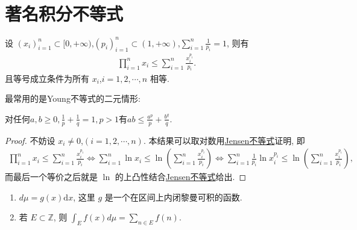 \documentclass[../../main.tex]{subfiles}
\begin{document}
\section{著名积分不等式}

\begin{theorem}[Young不等式初等形式]\label{theorem:Young不等式初等形式}
设 $(x_i)_{i = 1}^n \subset [0, +\infty)$,$(p_i)_{i = 1}^n \subset (1, +\infty)$,$\sum_{i = 1}^n \frac{1}{p_i} = 1$, 则有
\begin{align*}
\prod_{i = 1}^n x_i \leqslant \sum_{i = 1}^n \frac{x_i^{p_i}}{p_i}.
\end{align*}
且等号成立条件为所有 $x_i$,$i = 1,2,\cdots,n$ 相等.
\end{theorem}
\begin{note}
最常用的是Young不等式的二元情形:

对任何$a,b\geq0,\frac{1}{p}+\frac{1}{q}=1,p>1$有$ab\leqslant \frac{a^p}{p}+\frac{b^q}{q}.$
\end{note}
\begin{proof}
不妨设 $x_i \neq 0$,$(i = 1,2,\cdots,n)$. 本结果可以取对数用\hyperref[theorem:Jensen不等式1111]{Jensen不等式}证明, 即
\begin{align*}
\prod_{i = 1}^n x_i \leqslant \sum_{i = 1}^n \frac{x_i^{p_i}}{p_i}\Leftrightarrow \sum_{i = 1}^n \ln x_i \leqslant \ln \left(\sum_{i = 1}^n \frac{x_i^{p_i}}{p_i}\right) \Leftrightarrow \sum_{i = 1}^n \frac{1}{p_i} \ln x_i^{p_i} \leqslant \ln \left(\sum_{i = 1}^n \frac{x_i^{p_i}}{p_i}\right),
\end{align*}
而最后一个等价之后就是 $\ln$ 的上凸性结合\hyperref[theorem:Jensen不等式1111]{Jensen不等式}给出.
\end{proof}

\begin{definition}
\begin{enumerate}[(1)]
\item $d\mu = g(x)\mathrm{d}x$, 这里 $g$ 是一个在区间上内闭黎曼可积的函数.
\item 若 $E \subset \mathbb{Z}$, 则 $\int_E f(x) d\mu = \sum_{n \in E} f(n)$.
\end{enumerate}
\end{definition}
\end{document}
